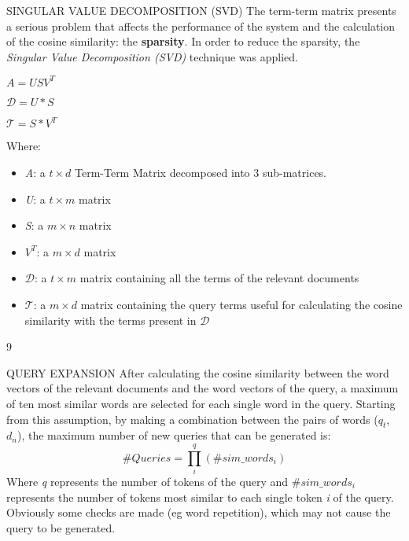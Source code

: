\begin{frame}{SINGULAR VALUE DECOMPOSITION (SVD)}
    The term-term matrix presents a serious problem that affects 
    the performance of the system and the calculation of the cosine similarity: 
    the {\bfseries{sparsity}}. In order to reduce the sparsity, the \emph{Singular 
    Value Decomposition (SVD)} technique was applied.
    \begin{minipage}{\linewidth}
        \centering
        \begin{minipage}{0.20\linewidth}
            \begin{block}{}
                \centering $ A = USV^T $
            \end{block}
            \begin{block}{}
                \centering $ \mathcal{D} = U*S $
            \end{block}
            \begin{block}{}
                \centering $ \mathcal{T} = S*V^T $
            \end{block}
        \end{minipage}
        \hspace{0.05\linewidth}
        \begin{minipage}{0.60\linewidth}
            Where:
            \begin{itemize}
                \item \emph{A}: a $t\times d$ Term-Term Matrix decomposed into 3 sub-matrices.
                \item \emph{U}: a $t\times m$ matrix
                \item \emph{S}: a $m\times n$ matrix
                \item \emph{$V^T$}: a $m\times d$ matrix
                \item \emph{$\mathcal{D}$}: a $t\times m$ matrix containing all the terms of the relevant documents
                \item \emph{$\mathcal{T}$}: a $m\times d$ matrix containing the query terms useful for calculating the cosine similarity with the terms present in $\mathcal{D}$
            \end{itemize}
        \end{minipage}
    \end{minipage}9
\end{frame}

\begin{frame}{QUERY EXPANSION}
    After calculating the cosine similarity between the word vectors of the 
    relevant documents and the word vectors of the query, a maximum of ten 
    most similar words are selected for each single word in the query. Starting 
    from this assumption, by making a combination between the pairs of 
    words ($q_t$, $d_n$), the maximum number of new queries that can be 
    generated is: 
    $$ \#Queries = \prod_i^q (\#sim\_words_i) $$
    Where \emph{q} represents the number of tokens of the query and \emph{$\#sim\_words_i$} 
    represents the number of tokens most similar to each single token \emph{i} of the 
    query. Obviously some checks are made (eg word repetition), which may 
    not cause the query to be generated.
\end{frame}


